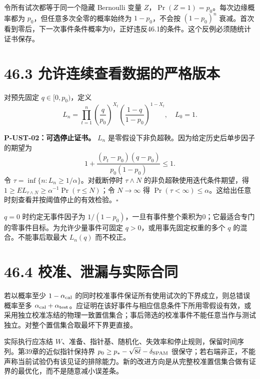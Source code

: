 \documentclass[
  11pt,
  oneside]{book}
\begin{document}
令所有试次都等于同一个隐藏 Bernoulli 变量
\(Z\)，\(\Pr(Z=1)=p_0\)。每次边缘概率都为
\(p_0\)，但任意多次全零的概率始终为 \(1-p_0\)，不会按 \((1-p_0)^n\)
衰减。首次看到零后，下一次事件条件概率为0，正好违反46.1的条件。这个反例必须随统计证书保存。

\hypertarget{ux5141ux8bb8ux8fdeux7eedux67e5ux770bux6570ux636eux7684ux4e25ux683cux7248ux672c}{%
\section{46.3
允许连续查看数据的严格版本}\label{ux5141ux8bb8ux8fdeux7eedux67e5ux770bux6570ux636eux7684ux4e25ux683cux7248ux672c}}

对预先固定 \(q\in[0,p_0)\)，定义 \[
L_n=\prod_{t=1}^n
\left(\frac q{p_0}\right)^{X_t}
\left(\frac{1-q}{1-p_0}\right)^{1-X_t},\quad L_0=1.
\]

\protect\hypertarget{p-ust-02}{}{}

\textbf{P-UST-02：可选停止证书。} \(L_n\)
是零假设下非负超鞅。因为给定历史后单步因子的期望为 \[
1+\frac{(p_t-p_0)(q-p_0)}{p_0(1-p_0)}\le1.
\] 令 \(\tau=\inf\{n:L_n\ge1/\alpha\}\)。对截断停时 \(\tau\wedge N\)
的非负超鞅使用迭代条件期望，得
\(1\ge E L_{\tau\wedge N}\ge\alpha^{-1}\Pr(\tau\le N)\)；令
\(N\to\infty\) 得
\(\Pr(\tau<\infty)\le\alpha\)。这给出任意时刻查看并按阈值停止的有效检验。\(\square\)

\(q=0\) 时约定无事件因子为
\(1/(1-p_0)\)，一旦有事件整个乘积为0；它最适合专门的零事件目标。为允许少量事件可固定
\(q>0\)，或用事先固定权重的多个 \(q\) 的混合。不能事后取最大 \(L_n(q)\)
而不校正。

\hypertarget{ux6821ux51c6ux6cc4ux6f0fux4e0eux5b9eux9645ux5408ux540c}{%
\section{46.4
校准、泄漏与实际合同}\label{ux6821ux51c6ux6cc4ux6f0fux4e0eux5b9eux9645ux5408ux540c}}

若以概率至少 \(1-\alpha_{\rm cal}\)
的同时校准事件保证所有使用试次的下界成立，则总错误概率至多
\(\alpha_{\rm cal}+\alpha_{\rm test}\)。应证明在该好事件与相应信息条件下所用零假设有效，或采用独立校准冻结的物理一致置信集合；事后筛选的校准事件不能任意当作与测试独立。对整个置信集合取最坏下界更直接。

实际执行应冻结
\(W\)、准备、指针基、随机化、失效率和停止规则，保留时间序列。第39章的近似指针保持界
\(p_0\ge p_*-\sqrt{8\ell}-\delta_{\rm SPAM}\)
很保守；若右端非正，不能声称当前试验仍有该见证的排除能力。新的改进方向是从完整校准置信集合做有证界的最优化，而不是随意减小误差条。
\end{document}
